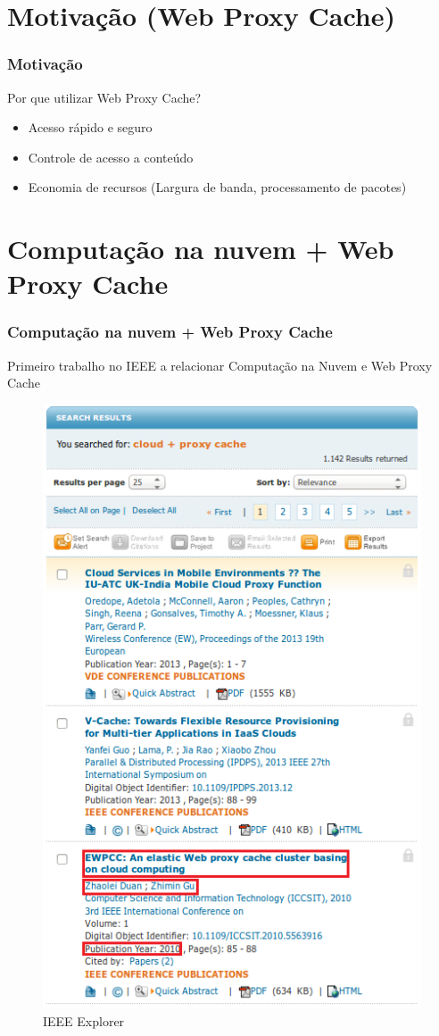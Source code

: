 \documentclass{beamer}
\begin{document}
    \section{Motivação (Web Proxy Cache)}
    \begin{frame}
      \frametitle{Motivação}
      Por que utilizar Web Proxy Cache?
      \begin{itemize}
       \item <2-> Acesso rápido e seguro
       \item <3-> Controle de acesso a conteúdo
       \item <4-> Economia de recursos (Largura de banda, processamento de pacotes)
      \end{itemize}
    \end{frame}
    \section{Computação na nuvem + Web Proxy Cache}
    \begin{frame}
     \frametitle{Computação na nuvem + Web Proxy Cache}
     Primeiro trabalho no IEEE a relacionar Computação na Nuvem e Web Proxy Cache
     \begin{figure}
      \centering
      \includegraphics[scale=0.4]{imagens/pesquisa2.jpg}
      \caption{IEEE Explorer}
     \end{figure}

    \end{frame}
\end{document}
